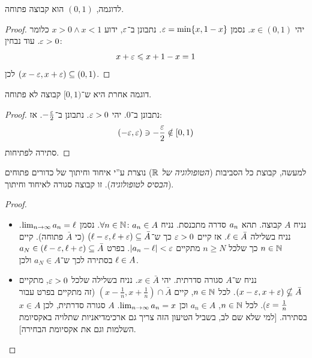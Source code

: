 \documentclass[name=רשימות חשבון דיפרנציאלי ואינטגרלי 1א]{../../../tex/classes/megasumPreamble}
\begin{document}




	לדוגמה, $(0, 1)$ הוא קבוצה פתוחה.
	\begin{proof}
		יהי $x \in (0, 1)$. נסמן $\eg = \min\{x, 1 - x\}$. נתבונן ב־$\eg$, ידוע $x > 0 \land x < 1$ כלומר $\eg > 0$. עוד נבחין:
		\[ x + \eg \le x + 1 - x  = 1 \]
		לכן $(x - \eg, x + \eg) \subseteq (0, 1)$.
	\end{proof}
	דוגמה אחרת היא ש־$[0, 1)$ קבוצה לא פתוחה.
	\begin{proof}
		נתבונן ב־$0$. יהי $\eg > 0$. נתבונן ב־$-\frac{\eg}{2}$. אז:
		\[ (-\eg, \eg) \ni - \frac{\eg}{2} \notin [0, 1) \]
		סתירה לפתיחות.
	\end{proof}

	למעשה, קבוצת כל הסביבות (\textit{הטופולוגיה של $\mathbb{R}$}) נוצרת ע''י איחוד וחיתוך של כדורים פתוחים (\textit{הבסיס לטופולוגיה}). זו קבוצה סגורה לאיחוד וחיתוך.


	\begin{proof}
		\begin{itemize}
			\item[$\implies$]נניח $A$ קבוצה. תהא $a_n$ סדרה מתכנסת. נניח $\forall n \in \mathbb{N} \colon a_n \in A$. נסמן $\lim_{n \to \infty} a_n = \ell$. נניח בשלילה $\ell \in \bar A$. אז קיים $\eg > 0$ כך ש־$(\ml - \eg, \ml + \eg) \subseteq \bar A$ (כי $\bar A$ פתוחה). קיים $n \in \mathbb{N}$ כך שלכל $n \ge N$ מתקיים $\sof{a_n - \ml} < \eg$. בפרט $a_N \in (\ml - \eg, \ml + \eg) \subseteq \bar A$ בסתירה לכך ש־$a_N \in A$ ולכן $\ell \in A$.
			\item[$\impliedby$]נניח ש־$A$ סגורה סדרתית. יהי $x \in \bar A$. נניח בשלילה שלכל $\eg > 0$, מתקיים $(x - \eg, x + \eg) \nsubseteq \bar A$. לכל $n \in \mathbb{N}$, קיים $(x - \frac{1}{n}, x + \frac{1}{n}) \cap \bar A$ (זה מתקיים בפרט עבור $\eg = \frac{1}{n}$). לכל $n \in \mathbb{N}$, $a_n \in A$ וכן $\lim_{n \to \infty} a_n = x$. $A$ סגורה סדרתית, לכן $x \in A$ בסתירה. [למי שלא שם לב, בשביל הטיעון הזה צריך גם ארכימדיאניות שתלויה באקסיומת השלמות וגם את אקסיומת הבחירה].
		\end{itemize}\envendproof
	\end{proof}
\end{document}
